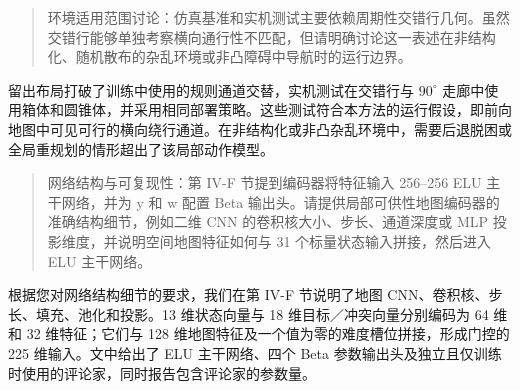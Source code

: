 \begin{quote}
环境适用范围讨论：仿真基准和实机测试主要依赖周期性交错行几何。虽然交错行能够单独考察横向通行性不匹配，但请明确讨论这一表述在非结构化、随机散布的杂乱环境或非凸障碍中导航时的运行边界。
\end{quote}
\response
留出布局打破了训练中使用的规则通道交替，实机测试在交错行与 $90^\circ$ 走廊中使用箱体和圆锥体，并采用相同部署策略。这些测试符合本方法的运行假设，即前向地图中可见可行的横向绕行通道。在非结构化或非凸杂乱环境中，需要后退脱困或全局重规划的情形超出了该局部动作模型。

\begin{quote}
网络结构与可复现性：第 IV-F 节提到编码器将特征输入 256--256 ELU 主干网络，并为 y 和 w 配置 Beta 输出头。请提供局部可供性地图编码器的准确结构细节，例如二维 CNN 的卷积核大小、步长、通道深度或 MLP 投影维度，并说明空间地图特征如何与 31 个标量状态输入拼接，然后进入 ELU 主干网络。
\end{quote}
\response
根据您对网络结构细节的要求，我们在第 IV-F 节说明了地图 CNN、卷积核、步长、填充、池化和投影。13 维状态向量与 18 维目标／冲突向量分别编码为 64 维和 32 维特征；它们与 128 维地图特征及一个值为零的难度槽位拼接，形成门控的 225 维输入。文中给出了 ELU 主干网络、四个 Beta 参数输出头及独立且仅训练时使用的评论家，同时报告包含评论家的参数量。

